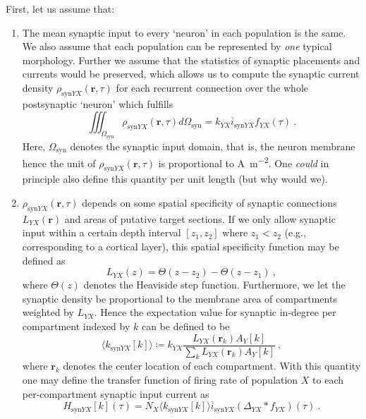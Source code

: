 First, let us assume that:
\begin{enumerate}
\item The mean synaptic input to every `neuron' in each population is the same. 
We also assume that each population can be represented by \emph{one} typical morphology. 
Further we assume that the statistics of synaptic placements and currents would be preserved, 
which allows us to compute the synaptic current density $\rho_{\mathrm{syn}YX}(\mathbf{r}, \tau)$ for each recurrent connection over the whole postsynaptic `neuron' which fulfills 
\begin{equation}
\iiint_{\Omega_\mathrm{syn}} \rho_{\mathrm{syn}YX}(\mathbf{r}, \tau) d\Omega_\mathrm{syn} = k_{YX} \overline{i}_{\mathrm{syn}YX} f_{YX}(\tau) ~.
\end{equation}
Here, $\Omega_\mathrm{syn}$ denotes the synaptic input domain, that is, the neuron  membrane hence the unit of $\rho_{\mathrm{syn}YX}(\mathbf{r}, \tau)$ is proportional to \si{\ampere\per\metre^2}. 
One \emph{could} in principle also define this quantity per unit length (but why would we). 

\item $\rho_{\mathrm{syn}YX}(\mathbf{r}, \tau)$ depends on some spatial specificity of synaptic connections $L_{YX}(\mathbf{r})$ and areas of putative target sections. 
If we only allow synaptic input within a certain depth interval $[z_1, z_2]$ where $z_1 < z_2$ (e.g., corresponding to a cortical layer), 
this spatial specificity function may be defined as 
\begin{equation}
L_{YX}(z) = \Theta(z - z_2) - \Theta(z - z_1) ~,
\end{equation}
where $\Theta(z)$ denotes the Heaviside step function. 
Furthermore, we let the synaptic density be proportional to the membrane area of compartments weighted by $L_{YX}$. 
Hence the expectation value for synaptic in-degree per compartment indexed by $k$ can be defined to be 
\begin{equation}
\langle k_{\mathrm{syn}YX}[k] \rangle \coloneq k_{YX} \frac{ L_{YX}(\mathbf{r}_k) A_{Y}[k]}{\sum_k L_{YX}(\mathbf{r}_k) A_{Y}[k]} ~,
\end{equation}
where $\mathbf{r}_k$ denotes the center location of each compartment.  
With this quantity one may define the transfer function  of firing rate of population $X$ to each per-compartment synaptic input current as
\begin{equation}
H_{\mathrm{syn}YX}[k](\tau) = N_X \langle k_{\mathrm{syn}YX}[k] \rangle \overline{i}_{\mathrm{syn}YX} \left( \Delta_{YX} \ast f_{YX}\right)(\tau) ~.
\end{equation}


\end{enumerate}
